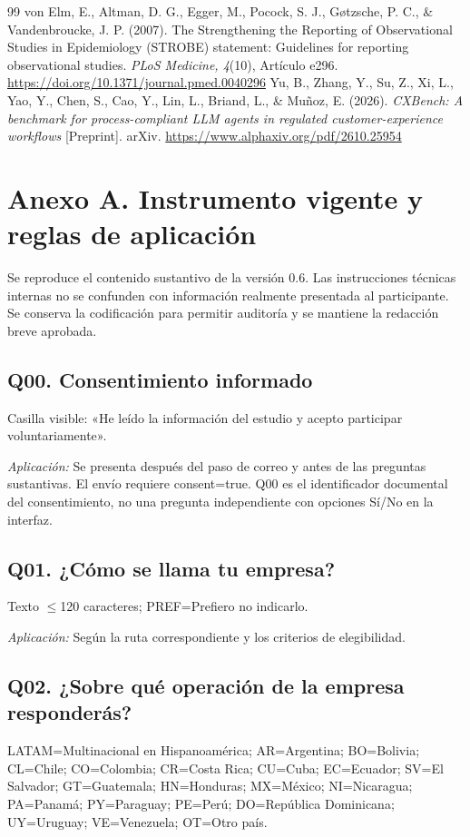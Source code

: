 \documentclass[12pt,letterpaper]{article}
\begin{document}
\begin{thebibliography}{99}
 von Elm, E., Altman, D. G., Egger, M., Pocock, S. J., Gøtzsche, P. C., \& Vandenbroucke, J. P. (2007). The Strengthening the Reporting of Observational Studies in Epidemiology (STROBE) statement: Guidelines for reporting observational studies. \emph{PLoS Medicine, 4}(10), Artículo e296. \url{https://doi.org/10.1371/journal.pmed.0040296}
 Yu, B., Zhang, Y., Su, Z., Xi, L., Yao, Y., Chen, S., Cao, Y., Lin, L., Briand, L., \& Muñoz, E. (2026). \emph{CXBench: A benchmark for process-compliant LLM agents in regulated customer-experience workflows} [Preprint]. arXiv. \url{https://www.alphaxiv.org/pdf/2610.25954}
\end{thebibliography}\endgroup
\clearpage
\section*{Anexo A. Instrumento vigente y reglas de aplicación}
Se reproduce el contenido sustantivo de la versión 0.6. Las instrucciones técnicas internas no se confunden con información realmente presentada al participante. Se conserva la codificación para permitir auditoría y se mantiene la redacción breve aprobada.

\subsection*{Q00. Consentimiento informado}
Casilla visible: «He leído la información del estudio y acepto participar voluntariamente».

\emph{Aplicación:} Se presenta después del paso de correo y antes de las preguntas sustantivas. El envío requiere consent=true. Q00 es el identificador documental del consentimiento, no una pregunta independiente con opciones Sí/No en la interfaz.

\subsection*{Q01. ¿Cómo se llama tu empresa?}
Texto $\leq$120 caracteres; PREF=Prefiero no indicarlo.

\emph{Aplicación:} Según la ruta correspondiente y los criterios de elegibilidad.

\subsection*{Q02. ¿Sobre qué operación de la empresa responderás?}
LATAM=Multinacional en Hispanoamérica; AR=Argentina; BO=Bolivia; CL=Chile; CO=Colombia; CR=Costa Rica; CU=Cuba; EC=Ecuador; SV=El Salvador; GT=Guatemala; HN=Honduras; MX=México; NI=Nicaragua; PA=Panamá; PY=Paraguay; PE=Perú; DO=República Dominicana; UY=Uruguay; VE=Venezuela; OT=Otro país.
\end{document}
